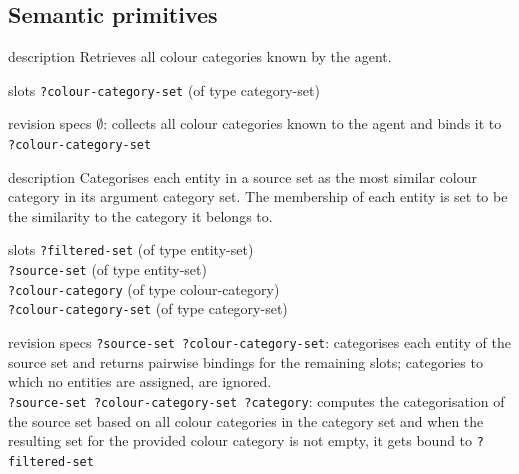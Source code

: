 \subsection{Semantic primitives}


\begin{explanation}{description}
  Retrieves all colour categories known by the agent.
\end{explanation}

\begin{explanation}{slots}
  \verb+?colour-category-set+ (of type category-set)
\end{explanation}

\begin{explanation}{revision specs}
  $\emptyset$: collects all colour categories known to the agent and
  binds it to \verb+?colour-category-set+
\end{explanation}


\begin{explanation}{description}
  Categorises each entity in a source set as the most similar colour
  category in its argument category set. The membership of each entity
  is set to be the similarity to the category it belongs to.
\end{explanation}

\begin{explanation}{slots}
  \verb+?filtered-set+ (of type entity-set) \\
  \verb+?source-set+ (of type entity-set) \\
  \verb+?colour-category+ (of type colour-category) \\
  \verb+?colour-category-set+ (of type category-set)
\end{explanation}

\begin{explanation}{revision specs}
  \verb+?source-set ?colour-category-set+: categorises each entity of
  the source set and returns pairwise bindings for the remaining
  slots; categories to which no entities are assigned, are ignored. \\
  \verb+?source-set ?colour-category-set ?category+: computes the
  categorisation of the source set based on all colour categories in
  the category set and when the resulting set for the provided colour
  category is not empty, it gets bound to \verb+?filtered-set+
\end{explanation}

